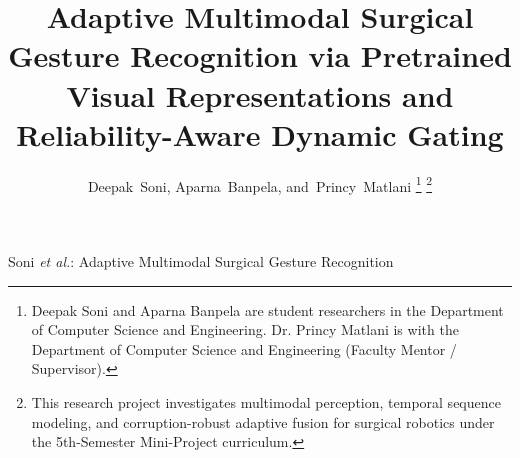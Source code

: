 \documentclass[10pt,journal]{IEEEtran}
\begin{document}
\title{Adaptive Multimodal Surgical Gesture Recognition via Pretrained Visual Representations and Reliability-Aware Dynamic Gating}

\author{Deepak~Soni,
        Aparna~Banpela,
        and~Princy~Matlani%
\thanks{Deepak Soni and Aparna Banpela are student researchers in the Department of Computer Science and Engineering. Dr. Princy Matlani is with the Department of Computer Science and Engineering (Faculty Mentor / Supervisor).}%
\thanks{This research project investigates multimodal perception, temporal sequence modeling, and corruption-robust adaptive fusion for surgical robotics under the 5th-Semester Mini-Project curriculum.}%
}

%
{Soni \MakeLowercase{\textit{et al.}}: Adaptive Multimodal Surgical Gesture Recognition}

\maketitle
\end{document}
